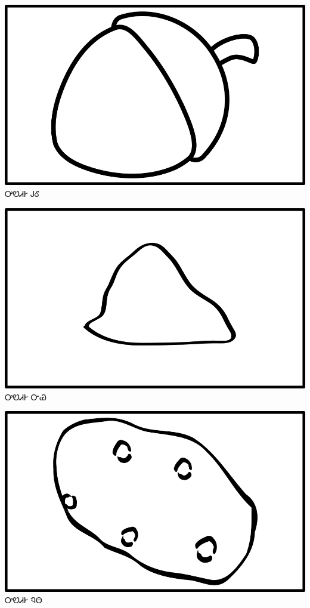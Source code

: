 \documentclass[avery5371]{flashcards}%
\begin{document}
    \begin{flashcard}{
        \includegraphics[width=0.95\columnwidth,height=.51\columnwidth,keepaspectratio]{../artwork/objects-neutral/gule}
    }
        \Huge ᎤᏬᏗᎨ ᎫᎴ
    \end{flashcard}

    \begin{flashcard}{
        \includegraphics[width=0.95\columnwidth,height=.51\columnwidth,keepaspectratio]{../artwork/objects-neutral/nvya}
    }
        \Huge ᎤᏬᏗᎨ ᏅᏯ
    \end{flashcard}

    \begin{flashcard}{
        \includegraphics[width=0.95\columnwidth,height=.51\columnwidth,keepaspectratio]{../artwork/objects-neutral/nuna}
    }
        \Huge ᎤᏬᏗᎨ ᏄᎾ
    \end{flashcard}
\end{document}
